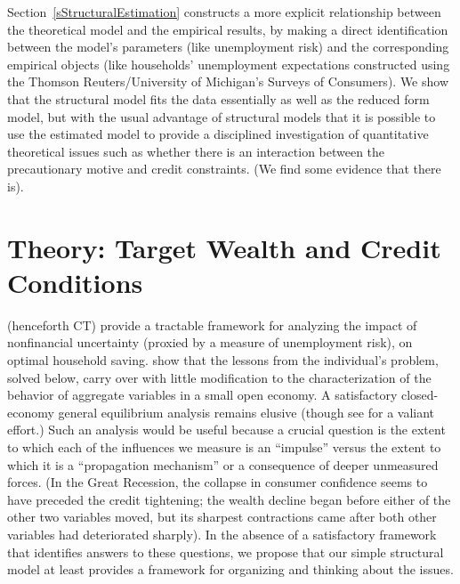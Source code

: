 \documentclass[titlepage]{\econtex}
\begin{document}
Section~\ref{sStructuralEstimation} constructs a more explicit relationship between the theoretical model and the empirical results, by making a direct identification between the model's parameters (like unemployment risk) and the corresponding empirical objects (like households' unemployment expectations constructed using the Thomson Reuters/University of Michigan's Surveys of Consumers).  We show that the structural model fits the data essentially as well as the reduced form model, but with the usual advantage of structural models that it is possible to use the estimated model to provide a disciplined investigation of quantitative theoretical issues such as whether there is an interaction between the precautionary motive and credit constraints.  (We find some evidence that there is).

\begin{comment}
Of course, \cite{keynes:generaltheory} famously argued that an
important cause of the Great Depression was a self-destructive
increase in saving that he memorably stigmatized as reflecting a
`paradox of thrift.'  While NIPA data are not available from before
the Great Depression, there seems to be little doubt that such a
saving rise did occur; but despite an insightful discussion of a
number of plausible explanations for the saving rise, Keynes did not
attempt to quantify the relative or absolute importance of those
explanations.
\end{comment}



\section{Theory: Target Wealth and Credit Conditions} \label{ssTractableBS}

\cite{ctDiscrete} (henceforth CT) provide a tractable framework for
analyzing the impact of nonfinancial uncertainty (proxied by a measure
of unemployment risk), on optimal household saving.  \cite{cjSOE} show
that the lessons from the individual's problem, solved below, carry
over with little modification to the characterization of the behavior
of aggregate variables in a small open economy.  A satisfactory
closed-economy general equilibrium analysis remains elusive (though
see \cite{challe&ragot:precautionaryS} for a valiant effort.)  Such an
analysis would be useful because a crucial question is the extent to
which each of the influences we measure is an ``impulse'' versus the
extent to which it is a ``propagation mechanism'' or a consequence of
deeper unmeasured forces.  (In the Great Recession, the collapse in
consumer confidence seems to have preceded the credit tightening; the
wealth decline began before either of the other two variables moved,
but its sharpest contractions came after both other variables had
deteriorated sharply).  In the absence of a satisfactory framework
that identifies answers to these questions, we propose that our
simple structural model at least provides a framework for organizing and
thinking about the issues.
\end{document}
